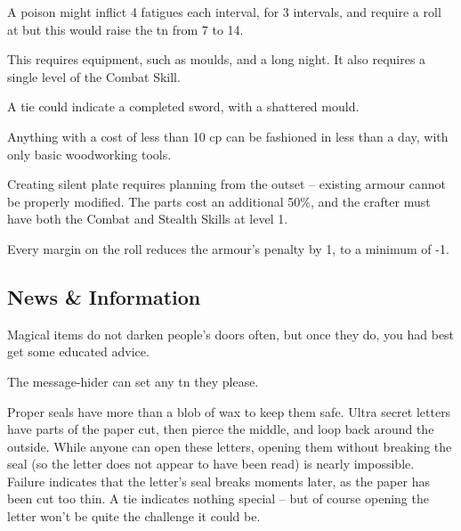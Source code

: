 \begin{multicols}{2}
A poison might inflict 4 \glspl{fatigue} each \gls{interval}, for 3 \glspl{interval}, and require a  roll at \tn[10] but this would raise the \gls{tn} from 7 to 14.


This requires equipment, such as moulds, and a long night.
It also requires a single level of the Combat Skill.

A tie could indicate a completed sword, with a shattered mould.

Anything with a cost of less than 10 \gls{cp} can be fashioned in less than a day, with only basic woodworking tools.

Creating silent plate requires planning from the outset -- existing armour cannot be properly modified.
The parts cost an additional 50\%, and the crafter must have both the Combat and Stealth Skills at level 1.

Every margin on the roll reduces the armour's penalty by 1, to a minimum of -1.



\subsection{News \& Information}



Magical items do not darken people's doors often, but once they do, you had best get some educated advice.


The message-hider can set any \gls{tn} they please.

Proper seals have more than a blob of wax to keep them safe.
Ultra secret letters have parts of the paper cut, then pierce the middle, and loop back around the outside.
While anyone can open these letters, opening them without breaking the seal (so the letter does not appear to have been read) is nearly impossible.
Failure indicates that the letter's seal breaks moments later, as the paper has been cut too thin.
A tie indicates nothing special -- but of course opening the letter won't be quite the challenge it could be.


\end{multicols}
